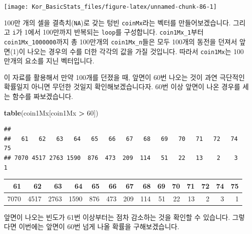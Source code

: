 \documentclass[]{book}
\newenvironment{Shaded}{\begin{snugshade}}{\end{snugshade}}
\newcommand{\DecValTok}[1]{\textcolor[rgb]{0.00,0.00,0.81}{#1}}
\newcommand{\KeywordTok}[1]{\textcolor[rgb]{0.13,0.29,0.53}{\textbf{#1}}}
\newcommand{\NormalTok}[1]{#1}
\newcommand{\OperatorTok}[1]{\textcolor[rgb]{0.81,0.36,0.00}{\textbf{#1}}}
\newcommand{\StringTok}[1]{\textcolor[rgb]{0.31,0.60,0.02}{#1}}
\begin{document}
\begin{center}\texttt{[image: Kor\_BasicStats\_files/figure-latex/unnamed-chunk-86-1]} \end{center}

100만 개의 셀을 결측치(\texttt{NA})로 갖는 텅빈 \texttt{coinMx}라는 벡터를 만들어보겠습니다. 그리고 \texttt{i}가 1에서 100만까지 반복되는 \texttt{loop}를 구성합니다. \texttt{coin1Mx\_1}부터 \texttt{coin1Mx\_1000000}까지 총 100만개의 \texttt{coin1Mx\_n}들은 모두 100개의 동전을 던져서 앞면(1)이 나오는 경우의 수를 더한 각각의 값을 가질 것입니다. 따라서 \texttt{coin1Mx}는 100만개의 요소를 지닌 벡터입니다.

이 자료를 활용해서 만약 100개를 던졌을 때, 앞면이 60번 나오는 것이 과연 극단적인 확률일지 아니면 무던한 것일지 확인해보겠습니다자. 60번 이상 앞면이 나온 경우를 세는 함수를 짜보겠습니다.

\begin{Shaded}
\begin{Highlighting}[]
\KeywordTok{table}\NormalTok{(coin1Mx[coin1Mx }\OperatorTok{>}\StringTok{ }\DecValTok{60}\NormalTok{])}
\end{Highlighting}
\end{Shaded}

\begin{verbatim}
## 
##   61   62   63   64   65   66   67   68   69   70   71   72   74   75 
## 7070 4517 2763 1590  876  473  209  114   51   22   13    2    3    1
\end{verbatim}

\begin{Shaded}
\end{Shaded}

\begin{tabular}{r|r|r|r|r|r|r|r|r|r|r|r|r|r}
\hline
61 & 62 & 63 & 64 & 65 & 66 & 67 & 68 & 69 & 70 & 71 & 72 & 74 & 75\\
\hline
7070 & 4517 & 2763 & 1590 & 876 & 473 & 209 & 114 & 51 & 22 & 13 & 2 & 3 & 1\\
\hline
\end{tabular}

앞면이 나오는 빈도가 61번 이상부터는 점차 감소하는 것을 확인할 수 있습니다. 그렇다면 이번에는 앞면이 60번 넘게 나올 확률을 구해보겠습니다.
\end{document}
